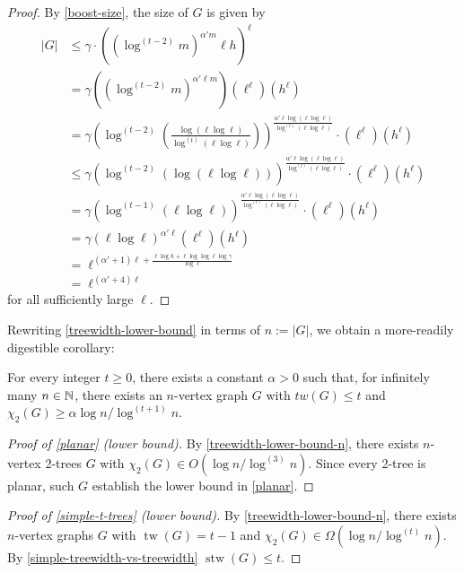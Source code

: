 \documentclass[kpfonts]{patmorin}
\DeclareMathOperator{\tw}{tw}
\DeclareMathOperator{\stw}{stw}
\newcommand{\trn}{\chi_2}
\theoremstyle{named}
\begin{document}
\begin{proof}
   By \cref{boost-size}, the size of $G$ is given by
   \begin{align*}
        |G| & \le \gamma\cdot \left((\log^{(t-2)}m)^{\alpha' m}\ell h\right)^\ell \\
        & = \gamma ((\log^{(t-2)}m)^{\alpha'\ell m}) (\ell^\ell) (h^\ell) \\
        & = \gamma \left(\log^{(t-2)}\left(\frac{\log(\ell\log\ell)}{\log^{(t)}(\ell\log\ell)}\right)\right)
        ^{\frac{\alpha'\ell\log(\ell\log\ell)}{\log^{(t)}(\ell\log\ell)}} \cdot (\ell^\ell) (h^\ell) \\
        & \le \gamma \left(\log^{(t-2)}(\log(\ell\log\ell))\right)
        ^{\frac{\alpha'\ell\log(\ell\log\ell)}{\log^{(t)}(\ell\log\ell)}} \cdot (\ell^\ell) (h^\ell) \\
        & = \gamma \left(\log^{(t-1)}(\ell\log\ell)\right)
        ^{\frac{\alpha'\ell\log(\ell\log\ell)}{\log^{(t)}(\ell\log\ell)}} \cdot (\ell^\ell) (h^\ell) \\
        & = \gamma (\ell\log\ell)^{\alpha'\ell} (\ell^\ell) (h^\ell) \\
        & = \ell^{(\alpha'+1)\ell + \frac{\ell\log h + \ell\log\log\ell \log\gamma}{\log\ell}} \\
        & = \ell^{(\alpha'+4)\ell}
   \end{align*}
   for all sufficiently large $\ell$.
\end{proof}

Rewriting \cref{treewidth-lower-bound} in terms of $n:=|G|$, we obtain a more-readily digestible corollary:

\begin{cor}\label{treewidth-lower-bound-n}
    For every integer $t\ge 0$, there exists a constant $\alpha>0$ such that, for infinitely many $n\in\mathbb{N}$,   there exists an $n$-vertex graph $G$ with $tw(G)\le t$ and  $\trn(G)\ge \alpha\log n/\log^{(t+1)} n$.
\end{cor}

\begin{proof}[Proof of \cref{planar} (lower bound)]
    By \cref{treewidth-lower-bound-n}, there exists $n$-vertex 2-trees $G$ with $\trn(G)\in O(\log n/\log^{(3)} n)$.  Since every 2-tree is planar, such $G$ establish the lower bound in \cref{planar}.
\end{proof}

\begin{proof}[Proof of \cref{simple-t-trees} (lower bound)]
    By \cref{treewidth-lower-bound-n}, there exists $n$-vertex graphs $G$ with $\tw(G)=t-1$ and $\trn(G)\in\Omega(\log n/\log^{(t)} n)$.  By \cref{simple-treewidth-vs-treewidth} $\stw(G)\le t$.
\end{proof}
\end{document}
